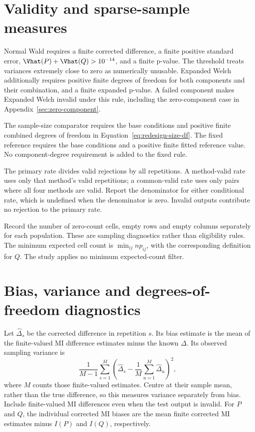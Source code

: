 \section{Validity and sparse-sample measures}
\label{sec:validity-rules}

Normal Wald requires a finite corrected difference, a finite positive
standard error, \(\Vhat(P)+\Vhat(Q)>10^{-14}\), and a finite p-value.
The threshold treats variances extremely close to zero as numerically
unusable. Expanded Welch additionally requires positive finite degrees
of freedom for both components and their combination, and a finite
expanded p-value. A failed component makes Expanded Welch invalid under
this rule, including the zero-component case in
Appendix~\ref{sec:zero-component}.

The sample-size comparator requires the base conditions and positive finite
combined degrees of freedom in Equation~\eqref{eq:redesign-size-df}. The
fixed reference requires the base conditions and a positive finite fitted
reference value. No component-degree requirement is added to the fixed rule.

The primary rate divides valid rejections by all repetitions. A
method-valid rate uses only that method's valid repetitions; a
common-valid rate uses only pairs where all four methods are valid. Report
the denominator for either conditional rate, which is undefined when
the denominator is zero. Invalid outputs contribute no rejection to
the primary rate.

Record the number of zero-count cells, empty rows and empty columns
separately for each population. These are sampling diagnostics rather
than eligibility rules. The minimum expected cell count is
\(\min_{ij}np_{ij}\), with the corresponding definition for \(Q\).
The study applies no minimum expected-count filter.

\section{Bias, variance and degrees-of-freedom diagnostics}
\label{sec:estimation-diagnostics}

Let \(\widehat\Delta_s\) be the corrected difference in repetition
\(s\). Its bias estimate is the mean of the finite-valued MI difference
estimates minus the known \(\Delta\). Its observed sampling variance is
\begin{equation}
 \frac{1}{M-1}\sum_{s=1}^M
 \left(\widehat\Delta_s-\frac{1}{M}\sum_{u=1}^M\widehat\Delta_u\right)^2,
 \label{eq:observed-sampling-variance}
\end{equation}
where \(M\) counts those finite-valued estimates. Centre at their sample
mean, rather than the true difference, so this measures variance
separately from bias. Include finite-valued MI differences even when the test
output is invalid. For \(P\) and \(Q\), the individual corrected MI biases
are the mean finite corrected MI estimates minus \(I(P)\) and \(I(Q)\),
respectively.

